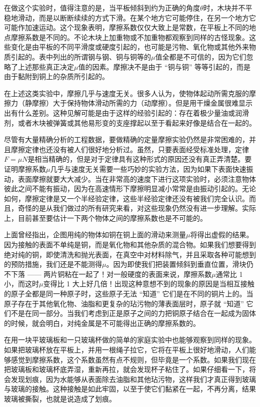 \documentclass[12pt,oneside]{book}
\begin{document}
在做这个实验时，值得注意的是，当平板倾斜到约为正确的角度$\theta$时，木块并不平稳地滑动，而是以断断续续的方式下滑。在某个地方它可能停住，在另一个地方它可能作加速运动。这个现象表明，摩擦系数仅仅大致上是常数，在平板上不同的地点摩擦系数是不同的。不论木块上加重物或不加重物都观察到同样的古怪现象。这些变化是由平板的不同平滑度或硬度引起的，也可能是污物、氧化物或其他外来物质引起的。表中列出的所谓钢与钢、铜与铜等的$\mu$值全都是不可信的，因为它们忽略了上述那些真正决定$\mu$值的因素。摩擦决不是由于 “铜与铜” 等等引起的，而是由于黏附到铜上的杂质所引起的。


在上述这类实验中，摩擦几乎与速度无关。很多人认为，使物体起动所需克服的摩擦力（静摩擦）大于保持物体滑动所需的力（动摩擦）。但是用干燥金属很难显示出有什么差别。这种见解可能是由于这样的经验引起的：存在着极少量油或润滑剂，或者木块被弹簧或其他易形变的支座撑起以至于看起来好像是结合在一起的。


尽管有大量精确分析的工程数据，要做精确的定量摩擦实验仍然是非常困难的，并且摩擦定律也还没有被人们很好地分析过。虽然，只要表面经受标准处理，定律$F = \mu N$是相当精确的，但是对于定律具有这种形式的原因还没有真正弄清楚。要证明摩擦系数$\mu$几乎与速度无关需要一些巧妙的实验方法，因为如果下表面快速振动，表面摩擦就要大大减少。当在非常高的速度下进行这项实验时，必须注意物体彼此之间不能有振动，因为在高速情形下摩擦明显减小常常是由振动引起的。无论如何，摩擦定律是又一个半经验定律，这些半经验定律还没有被我们完全认识。而且，奇怪的是从我们做过的所有研究来看，对这些现象仍然没有进一步理解。实际上，目前甚至要估计一下两个物体之间的摩擦系数也是不可能的。


上面曾经指出，企图用纯的物体如铜在铜上面的滑动来测量$\mu$将得出虚假的结果。因为接触的表面不单纯是铜，而是氧化物和其他杂质的混合物。如果我们想要得到绝对纯的铜，即使清洗和抛光表面，在真空中对材料除气，并且采取各种可能想到的预防措施，我们还是不能测得$\mu$。因为即使我们把装置倾斜到垂直位置，滑块仍不下落 —— 两片铜粘在一起了！对一般硬度的表面来说，摩擦系数$\mu$通常比 1 小，而这时$\mu$变得比 1 大上好几倍！出现这种意想不到的现象的原因是当相互接触的原子全都是同一种原子时，这些原子无法 “知道” 它们是在不同的铜片上的。当原子存在于其他氧化物、油脂和更复杂的玷污物的薄表面层时，原子就 “知道” 它们不是在同一部分。当我们考虑到正是原子之间的力把铜原子结合在一起成为固体的时候，就会明白，对纯金属是不可能得出正确的摩擦系数的。


在用一块平玻璃板和一只玻璃杯做的简单的家庭实验中也能够观察到同样的现象。如果把玻璃杯放在平板上，并用一根绳子拉它，它将在平板上很好地滑动，人们能够感觉到摩擦系数，这个系数虽然有点不规则，但毕竟是一个系数。如果我们现在把玻璃板和玻璃杯底弄湿，重新再拉，就会发现杯子粘住了。如果仔细看一下，将会发现划痕，因为水能够从表面除去油脂和其他玷污物，这样我们才真正得到玻璃与玻璃的接触。这种接触是如此牢固，以至于使它们黏紧在一起，不再分离，结果玻璃被撕裂，也就是说造成了划痕。
\end{document}
